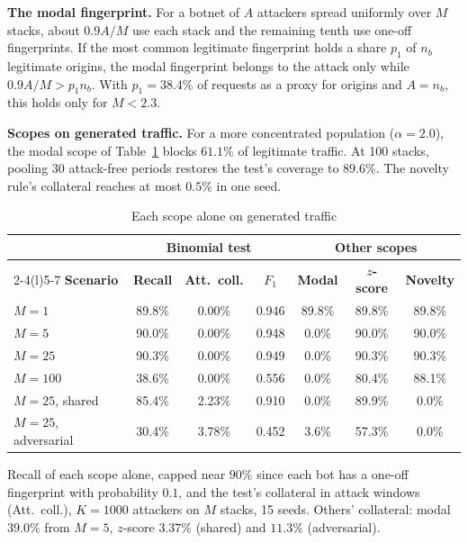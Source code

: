\documentclass[conference,letterpaper,10pt]{IEEEtran}
\newcommand\1{\textit{(i)}}
\newcommand\2{\textit{(ii)}}
\newcommand\3{\textit{(iii)}}
\newcommand\4{\textit{(iv)}}
\newcommand\5{\textit{(v)}}
\newcommand\6{\textit{(vi)}}
\newcommand\7{\textit{(vii)}}
\newcommand\8{\textit{(viii)}}
\newcommand\9{\textit{(ix)}}
\begin{document}
\textbf{The modal fingerprint.} For a botnet of $A$ attackers spread uniformly over $M$ stacks, about $0.9A/M$ use each stack and the remaining tenth use one-off fingerprints. If the most common legitimate fingerprint holds a share $p_1$ of $n_b$ legitimate origins, the modal fingerprint belongs to the attack only while $0.9A/M > p_1 n_b$. With $p_1 = 38.4\%$ of requests as a proxy for origins and $A = n_b$, this holds only for $M < 2.3$.

\textbf{Scopes on generated traffic.} For a more concentrated population ($\alpha = 2.0$), the modal scope of Table~\ref{tab:symbolic} blocks $61.1\%$ of legitimate traffic. At 100 stacks, pooling 30 attack-free periods restores the test's coverage to $89.6\%$. The novelty rule's collateral reaches at most $0.5\%$ in one seed. 

\begin{table}[!ht]
\centering
\caption{Each scope alone on generated traffic}
\label{tab:symbolic}
\scriptsize
\setlength{\tabcolsep}{1.6pt}
\begin{tabular}{@{}lcccccc@{}}
\toprule
 & \multicolumn{3}{c}{\textbf{Binomial test}} & \multicolumn{3}{c}{\textbf{Other scopes}} \\
\cmidrule(lr){2-4}\cmidrule(l){5-7}
\textbf{Scenario} & \textbf{Recall} & \textbf{Att.\ coll.} & \textbf{$F_1$} & \textbf{Modal} & \textbf{$z$-score} & \textbf{Novelty} \\
\midrule
$M{=}1$               & 89.8\% & 0.00\% & 0.946 & 89.8\% & 89.8\% & 89.8\% \\
$M{=}5$               & 90.0\% & 0.00\% & 0.948 & 0.0\% & 90.0\% & 90.0\% \\
$M{=}25$              & 90.3\% & 0.00\% & 0.949 & 0.0\% & 90.3\% & 90.3\% \\
$M{=}100$             & 38.6\% & 0.00\% & 0.556 & 0.0\% & 80.4\% & 88.1\% \\
$M{=}25$, shared      & 85.4\% & 2.23\% & 0.910 & 0.0\% & 89.9\% & 0.0\% \\
$M{=}25$, adversarial & 30.4\% & 3.78\% & 0.452 & 3.6\% & 57.3\% & 0.0\% \\
\bottomrule
\end{tabular}

\vspace{2pt}
\begin{minipage}{\linewidth}\footnotesize Recall of each scope alone, capped near $90\%$ since each bot has a one-off fingerprint with probability $0.1$, and the test's collateral in attack windows (Att.\ coll.), $K = 1000$ attackers on $M$ stacks, 15 seeds. Others' collateral: modal $39.0\%$ from $M{=}5$, $z$-score $3.37\%$ (shared) and $11.3\%$ (adversarial).\end{minipage}
\end{table}
\end{document}
